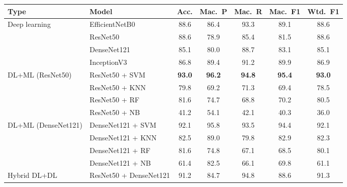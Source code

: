 \begin{tabular}{llccccc}
\toprule
Type & Model & Acc. & Mac.\ P & Mac.\ R & Mac.\ F1 & Wtd.\ F1 \\
\midrule
Deep learning & EfficientNetB0 & 88.6 & 86.4 & 93.3 & 89.1 & 88.6 \\
 & ResNet50 & 88.6 & 78.9 & 85.4 & 81.5 & 88.6 \\
 & DenseNet121 & 85.1 & 80.0 & 88.7 & 83.1 & 85.1 \\
 & InceptionV3 & 86.8 & 89.4 & 91.2 & 89.9 & 86.9 \\
\midrule
DL+ML (ResNet50) & ResNet50 + SVM & \textbf{93.0} & \textbf{96.2} & \textbf{94.8} & \textbf{95.4} & \textbf{93.0} \\
 & ResNet50 + KNN & 79.8 & 69.2 & 71.3 & 69.4 & 78.5 \\
 & ResNet50 + RF & 81.6 & 74.7 & 68.8 & 70.2 & 80.5 \\
 & ResNet50 + NB & 41.2 & 54.1 & 42.1 & 40.3 & 36.0 \\
\midrule
DL+ML (DenseNet121) & DenseNet121 + SVM & 92.1 & 95.8 & 93.5 & 94.4 & 92.1 \\
 & DenseNet121 + KNN & 82.5 & 89.0 & 79.8 & 82.9 & 82.3 \\
 & DenseNet121 + RF & 81.6 & 74.8 & 67.1 & 68.5 & 80.1 \\
 & DenseNet121 + NB & 61.4 & 82.5 & 66.1 & 69.8 & 61.1 \\
\midrule
Hybrid DL+DL & ResNet50 + DenseNet121 & 91.2 & 84.7 & 94.8 & 88.6 & 91.3 \\
\bottomrule
\end{tabular}
